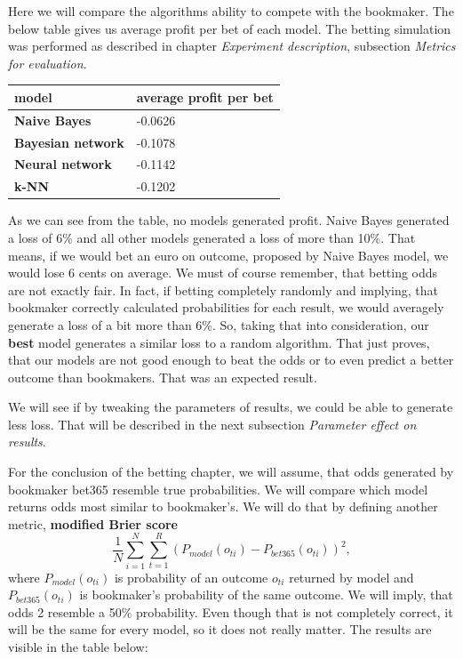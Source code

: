 \documentclass[conference]{IEEEtran}
\begin{document}
Here we will compare the algorithms ability to compete with the bookmaker. The below table
gives us average profit per bet of each model. The betting simulation was performed as
described in chapter \textit{Experiment description}, subsection \textit{Metrics for
evaluation}.

\begin{table}[!ht]
    \centering
    \begin{tabular}{|l|l|}
    \hline
        \textbf{model} & average profit per bet \\ \hline
        \textbf{Naive Bayes} & -0.0626 \\ \hline
        \textbf{Bayesian network} & -0.1078 \\ \hline
        \textbf{Neural network} & -0.1142 \\ \hline
        \textbf{k-NN} & -0.1202 \\ \hline
    \end{tabular}
\end{table}

As we can see from the table, no models generated profit. Naive Bayes generated a loss of 6\%
and all other models generated a loss of more than 10\%. That means, if we would bet an euro 
on outcome, proposed by Naive Bayes model, we would lose 6 cents on average. We must of course
remember, that betting odds are not exactly fair. In fact, if betting completely 
randomly and implying, that bookmaker correctly calculated probabilities for each result, 
we would averagely generate a loss of a bit more than 6\%. So, taking that into consideration,
our \textbf{best} model generates a similar loss to a random algorithm. That just proves, that
our models are not good enough to beat the odds or to even predict a better outcome than
bookmakers. That was an expected result.

We will see if by tweaking the parameters of results, we could be able to generate less loss.
That will be described in the next subsection \textit{Parameter effect on results}.

For the conclusion of the betting chapter, we will assume, that odds generated by bookmaker
bet365 resemble true probabilities. We will compare which model returns odds most similar to
bookmaker's. We will do that by defining another metric, \textbf{modified Brier score}
$$\frac{1}{N} \sum_{i=1}^{N} \sum_{t=1}^{R} {(P_{model}(o_{ti}) - P_{bet365}(o_{ti}))^2},$$
where $P_{model}(o_{ti})$ is probability of an outcome $o_{ti}$ returned by model and 
$P_{bet365}(o_{ti})$ is bookmaker's probability of the same outcome. We will imply, that 
odds 2 resemble a 50\% probability. Even though that is not completely correct, it will be 
the same for every model, so it does not really matter. The results are visible in the table
below:
\end{document}
